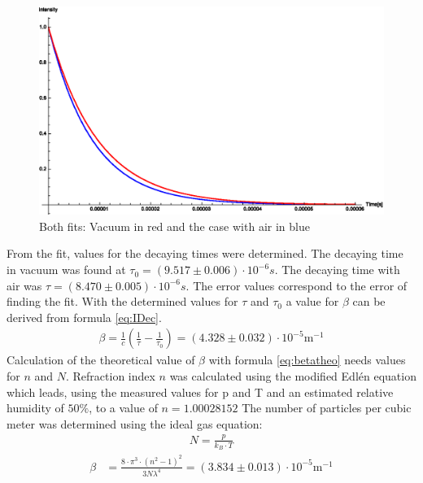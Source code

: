 \documentclass[
	parskip=half,10pt,
	numbers= noenddot, %
	toc=flat, %
	oneside,
	twocolumn,
	]{scrartcl}
\begin{document}
\begin{figure}
\includegraphics[width=\textwidth/2]{images/airvacuum.eps}
\caption{Both fits: Vacuum in red and the case with air in blue }
\label{fig:airvacuum}
\end{figure}
From the fit, values for the decaying times were determined. The decaying time in vacuum was found at $\tau_0=(9.517\pm0.006)\cdot 10^{-6}s$. The decaying time with air was $\tau=(8.470\pm0.005)\cdot 10^{-6}s$. The error values correspond to the error of finding the fit.
With the determined values for $\tau$ and $\tau_0$ a value for $\beta$ can be derived from formula \ref{eq:IDec}.
\begin{align}
\beta=\frac{1}{c}\left(\frac{1}{\tau}-\frac{1}{\tau_0}\right)=(4.328\pm0.032)\cdot 10^{-5}\si{\meter}^{-1}
\end{align}
Calculation of the theoretical value of $\beta$ with formula \ref{eq:betatheo} needs values for $n$ and $N$. Refraction index $n$ was calculated using the modified Edlén equation which leads, using the measured values for p and T and an estimated relative humidity of $50\%$, to a value of $n=1.00028152$\cite{edlen}
The number of particles per cubic meter was determined using the ideal gas equation:
\begin{align}
N=\frac{p}{k_B\cdot T}
\end{align}
\begin{align}
\beta &= \frac{8\cdot \pi^3\cdot (n^2-1)^2}{3 N \lambda^4}=(3.834\pm0.013)\cdot 10^{-5}\si{\meter}^{-1}
\end{align}
\end{document}
